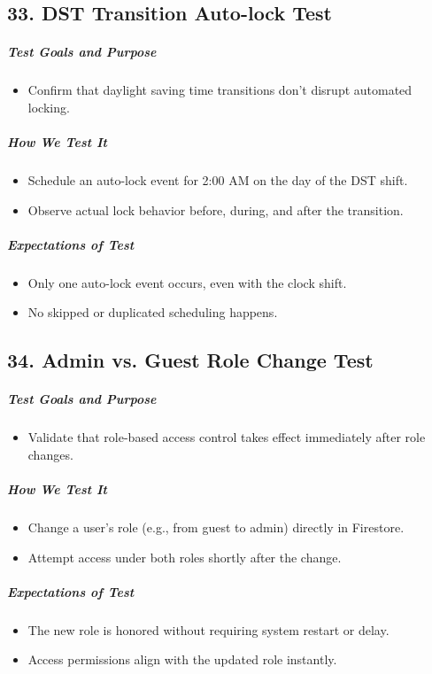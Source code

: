 \subsection*{33. DST Transition Auto-lock Test}
\subparagraph{Test Goals and Purpose}
\begin{itemize}
    \item Confirm that daylight saving time transitions don't disrupt automated locking.
\end{itemize}
\subparagraph{How We Test It}
\begin{itemize}
    \item Schedule an auto-lock event for 2:00 AM on the day of the DST shift.
    \item Observe actual lock behavior before, during, and after the transition.
\end{itemize}
\subparagraph{Expectations of Test}
\begin{itemize}
    \item Only one auto-lock event occurs, even with the clock shift.
    \item No skipped or duplicated scheduling happens.
\end{itemize}

\subsection*{34. Admin vs. Guest Role Change Test}
\subparagraph{Test Goals and Purpose}
\begin{itemize}
    \item Validate that role-based access control takes effect immediately after role changes.
\end{itemize}
\subparagraph{How We Test It}
\begin{itemize}
    \item Change a user's role (e.g., from guest to admin) directly in Firestore.
    \item Attempt access under both roles shortly after the change.
\end{itemize}
\subparagraph{Expectations of Test}
\begin{itemize}
    \item The new role is honored without requiring system restart or delay.
    \item Access permissions align with the updated role instantly.
\end{itemize}

